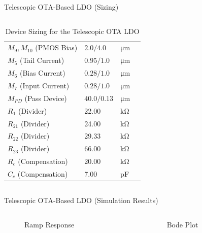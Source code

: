 \documentclass[10pt, aspectratio=169]{beamer}
\newcommand{\svg}[3]{
    \begin{figure}
        \centering
        
        \caption{#2}
    \end{figure}
}
\begin{document}
\begin{frame}{Telescopic OTA-Based LDO (Sizing)}
\begin{columns}[T,onlytextwidth]
\begin{column}{0.45\textwidth}
\begin{table}[htbp]
\begin{tabular}{@{}lllc@{}}
                    $M_9, M_{10}$ (PMOS Bias) & $2.0 / 4.0$ & \unit{\micro\meter} \\
                    $M_5$ (Tail Current) & $0.95 / 1.0$ & \unit{\micro\meter} \\
                    $M_6$ (Bias Current) & $0.28 / 1.0$ & \unit{\micro\meter} \\
                    $M_7$ (Input Current) & $0.28 / 1.0$ & \unit{\micro\meter} \\
                    \midrule
                    $M_{PD}$ (Pass Device) & $40.0 / 0.13$ & \unit{\micro\meter} \\
                    \midrule
                    $R_1$ (Divider) & 22.00 & \unit{\kilo\ohm} \\
                    $R_{21}$ (Divider) & 24.00 & \unit{\kilo\ohm} \\
                    $R_{22}$ (Divider) & 29.33 & \unit{\kilo\ohm} \\
                    $R_{23}$ (Divider) & 66.00 & \unit{\kilo\ohm} \\
                    $R_c$ (Compensation) & 20.00 & \unit{\kilo\ohm} \\
                    $C_c$ (Compensation) & 7.00 & \unit{\pico\farad} \\
                    \bottomrule
                \end{tabular}
                \caption{Device Sizing for the Telescopic OTA LDO}
            \end{table}
        \end{column}
    \end{columns}
\end{frame}

\begin{frame}{Telescopic OTA-Based LDO (Simulation Results)}
    \begin{columns}[c,onlytextwidth]
        \begin{column}{0.48\textwidth}
            \svg{../simulations/images/tel_tran.svg}{Ramp Response}{1}
        \end{column}
        \begin{column}{0.48\textwidth}
            \svg{../simulations/images/tel_bode.svg}{Bode Plot}{1}
        \end{column}
    \end{columns}
\end{frame}
\end{document}
